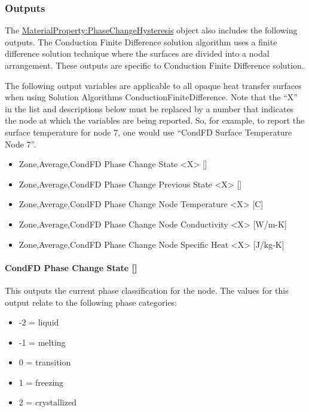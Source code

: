 \subsubsection{Outputs}\label{materialpropertyphasechangehysteresis-outputs}

The \hyperref[materialpropertyphasechangehysteresis]{MaterialProperty:PhaseChangeHysteresis} object also includes the following outputs. The Conduction Finite Difference solution algorithm uses a finite difference solution technique where the surfaces are divided into a nodal arrangement. These outputs are specific to Conduction Finite Difference solution.

The following output variables are applicable to all opaque heat transfer surfaces when using Solution Algorithms ConductionFiniteDifference. Note that the ``X'' in the list and descriptions below must be replaced by a number that indicates the node at which the variables are being reported.  So, for example, to report the surface temperature for node 7, one would use ``CondFD Surface Temperature Node 7''.

\begin{itemize}
\item
  Zone,Average,CondFD Phase Change State \textless{}X\textgreater{} {[]}
\item
  Zone,Average,CondFD Phase Change Previous State \textless{}X\textgreater{} {[]}
\item
  Zone,Average,CondFD Phase Change Node Temperature \textless{}X\textgreater{} {[}C{]}
\item
  Zone,Average,CondFD Phase Change Node Conductivity \textless{}X\textgreater{} {[}W/m-K{]}
\item
  Zone,Average,CondFD Phase Change Node Specific Heat \textless{}X\textgreater{} {[}J/kg-K{]}
\end{itemize}

\paragraph{CondFD Phase Change State {[]}}\label{condfd-phase-change-state}

This outputs the current phase classification for the node.  The values for this output relate to the following phase categories:

\begin{itemize}
\item
-2 = liquid
\item
-1 = melting
\item
0 = transition
\item
1 = freezing
\item
2 = crystallized
\end{itemize}

